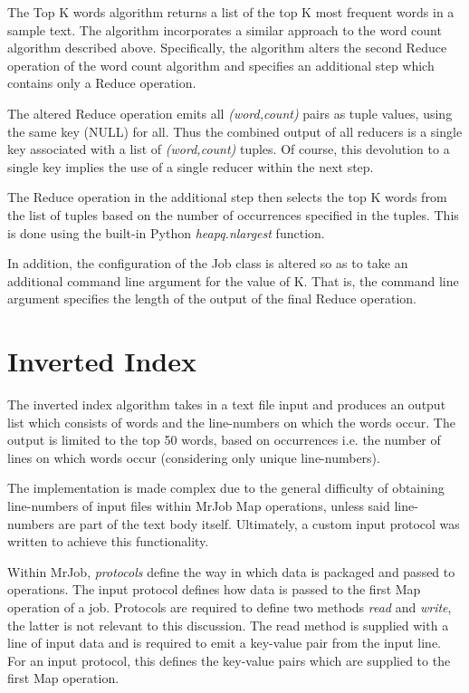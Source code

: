\documentclass[journal,10pt]{IEEEtran}
\begin{document}
The Top K words algorithm returns a list of the top K most frequent words in a sample text. The algorithm incorporates a similar approach to the word count algorithm described above. Specifically, the algorithm alters the second Reduce operation of the word count algorithm and specifies an additional step which contains only a Reduce operation.

The altered Reduce operation emits all \textit{(word,count)} pairs as tuple values, using the same key (NULL) for all. Thus the combined output of all reducers is a single key associated with a list of \textit{(word,count)} tuples. Of course, this devolution to a single key implies the use of a single reducer within the next step.

The Reduce operation in the additional step then selects the top K words from the list of tuples based on the number of occurrences specified in the tuples. This is done using the built-in Python \textit{heapq.nlargest} function.

In addition, the configuration of the Job class is altered so as to take an additional command line argument for the value of K. That is, the command line argument specifies the length of the output of the final Reduce operation.

\section{Inverted Index}

The inverted index algorithm takes in a text file input and produces an output list which consists of words and the line-numbers on which the words occur. The output is limited to the top 50 words, based on occurrences i.e. the number of lines on which words occur (considering only unique line-numbers).

The implementation is made complex due to the general difficulty of obtaining line-numbers of input files within MrJob Map operations, unless said line-numbers are part of the text body itself. Ultimately, a custom input protocol was written to achieve this functionality. 

Within MrJob, \textit{protocols} define the way in which data is packaged and passed to operations. The input protocol defines how data is passed to the first Map operation of a job. Protocols are required to define two methods \textit{read} and \textit{write}, the latter is not relevant to this discussion. The read method is supplied with a line of input data and is required to emit a key-value pair from the input line. For an input protocol, this defines the key-value pairs which are supplied to the first Map operation.
\end{document}
